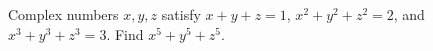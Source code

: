 Complex numbers $x,y,z$ satisfy $x+y+z=1$, $x^2+y^2+z^2=2$, and $x^3+y^3+z^3=3$. Find $x^5+y^5+z^5$.
